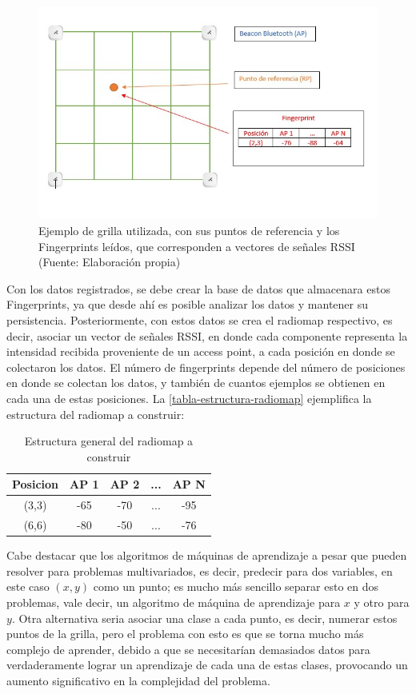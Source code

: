 \newpage

\begin{figure}[ht!]
\centering
\includegraphics[width=.6\textwidth]{figures/fingerprints.jpg}
\caption[Ejemplo grilla Fingerprint]{Ejemplo de grilla utilizada, con sus puntos de referencia y los Fingerprints leídos, que corresponden a vectores de señales RSSI\\
{\scriptsize (Fuente: Elaboración propia)}}
\label{fig:fingerprints}
\end{figure}

Con los datos registrados, se debe crear la base de datos que almacenara estos Fingerprints, ya que desde ahí es posible analizar los datos y mantener su persistencia. Posteriormente, con estos datos se crea el radiomap respectivo, es decir, asociar un vector de señales RSSI, en donde cada componente representa la intensidad recibida proveniente de un access point, a cada posición en donde se colectaron los datos. El número de fingerprints depende del número de posiciones en donde se colectan los datos, y también de cuantos ejemplos se obtienen en cada una de estas posiciones. La \autoref{tabla-estructura-radiomap} ejemplifica la estructura del radiomap a construir:

\begin{table}[ht!]
\centering
\caption{Estructura general del radiomap a construir}
\label{tabla-estructura-radiomap}
\begin{tabular}{|c|c|c|c|c|}
\hline
Posicion & AP 1 & AP 2 & ... & AP N \\ \hline
(3,3)    & -65  & -70  & ... & -95  \\ \hline
(6,6)    & -80  & -50  & ... & -76  \\ \hline
\end{tabular}
\end{table}

Cabe destacar que los algoritmos de máquinas de aprendizaje a pesar que pueden resolver para problemas multivariados, es decir, predecir para dos variables, en este caso $(x,y)$ como un punto; es mucho más sencillo separar esto en dos problemas, vale decir, un algoritmo de máquina de aprendizaje para $x$ y otro para $y$. Otra alternativa seria asociar una clase a cada punto, es decir, numerar estos puntos de la grilla, pero el problema con esto es que se torna mucho más complejo de aprender, debido a que se necesitarían demasiados datos para verdaderamente lograr un aprendizaje de cada una de estas clases, provocando un aumento significativo en la complejidad del problema.

